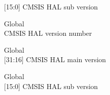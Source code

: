 \begin{DoxyRefList}
\label{deprecated__deprecated000038}%
%
\mbox{[}15\+:0\mbox{]} CMSIS HAL sub version  
\item[Global \doxylink{core__sc300_8h_a2f960c3c99ab33e1cf4b5287821c44dd}{\+\_\+\+\_\+\+SC300\+\_\+\+CMSIS\+\_\+\+VERSION} ]\hfill \\
\label{deprecated__deprecated000042}%
%
CMSIS HAL version number  
\item[Global \doxylink{core__sc300_8h_a0e2124db4f74f2b355904314accf1790}{\+\_\+\+\_\+\+SC300\+\_\+\+CMSIS\+\_\+\+VERSION\+\_\+\+MAIN} ]\hfill \\
\label{deprecated__deprecated000040}%
%
\mbox{[}31\+:16\mbox{]} CMSIS HAL main version  
\item[Global \doxylink{core__sc300_8h_a664c9e59952455ddeee28173b864fe9d}{\+\_\+\+\_\+\+SC300\+\_\+\+CMSIS\+\_\+\+VERSION\+\_\+\+SUB} ]\hfill \\
\label{deprecated__deprecated000041}%
%
\mbox{[}15\+:0\mbox{]} CMSIS HAL sub version 
\end{DoxyRefList}